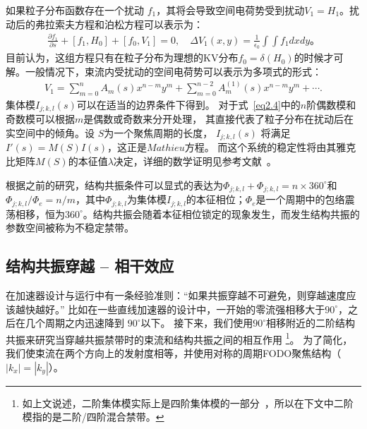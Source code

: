 如果粒子分布函数存在一个扰动 $f_1$，其将会导致空间电荷势受到扰动$V_1=H_1$。扰动后的弗拉索夫方程和泊松方程可以表示为：
\begin{eqnarray}\label{eq2.3}
\frac{\partial f_1}{\partial s} + [f_1,H_0] +  [f_0,V_1]=0,   \quad \Delta V_1(x,y)  = \frac{1}{\epsilon_0}  \int \int f_1 dxdy\text{。}
\end{eqnarray}
目前认为，这组方程只有在粒子分布为理想的KV分布$f_0=\delta(H_0)$的时候才可解。一般情况下，束流内受扰动的空间电荷势可以表示为多项式的形式：
\begin{eqnarray}\label{eq2.4}
V_1=\sum_{m=0}^{n}A_m(s)x^{n-m}y^m +\sum_{m=0}^{n-2}A_m^{(1)}(s)x^{n-m}y^m+\cdots.
\end{eqnarray}
集体模$I_{j;k,l}(s)$可以在适当的边界条件下得到。
对于式~\ref{eq2.4}中的$n$阶偶数模和奇数模可以根据$m$是偶数或奇数来分开处理，
其直接代表了粒子分布在扰动后在实空间中的倾角。设 $S$为一个聚焦周期的长度，
$I_{j;k,l}(s)$ 将满足$I'(s) = M(S)I(s)$，这正是$Mathieu$方程。
而这个系统的稳定性将由其雅克比矩阵$M(S)$的本征值$\lambda$决定，详细的数学证明见参考文献~\cite{11,12,18,19}。

根据之前的研究\cite{11,12}，结构共振条件可以显式的表达为$\Phi_{j;k,l}+\Phi_{j;k,l}=n\times 360^{\circ}$和$\Phi_{j;k,l}/\Phi_{e}=n/m$，其中$\Phi_{j;k,l}$为集体模$I_{j;k,l}$的本征相位；$\Phi_{e}$是一个周期中的包络震荡相移，恒为$360^{\circ}$。结构共振会随着本征相位锁定的现象发生，而发生结构共振的参数空间被称为不稳定禁带。

\subsection{结构共振穿越 -- 相干效应}
\label{section:Crossing_Coherent}
在加速器设计与运行中有一条经验准则：“如果共振穿越不可避免，则穿越速度应该越快越好。”
比如在一些直线加速器的设计中，一开始的零流强相移大于$90^{\circ}$，之后在几个周期之内迅速降到 $90^{\circ}$以下。
接下来，我们使用$90^{\circ}$相移附近的二阶结构共振来研究当穿越共振禁带时的束流和结构共振之间的相互作用
\footnote{如上文说述，二阶集体模实际上是四阶集体模的一部分~\cite{12}，所以在下文中二阶模指的是二阶/四阶混合禁带。}。
为了简化，我们使束流在两个方向上的发射度相等，并使用对称的周期FODO聚焦结构（$|k_x|=|k_y|$）。

